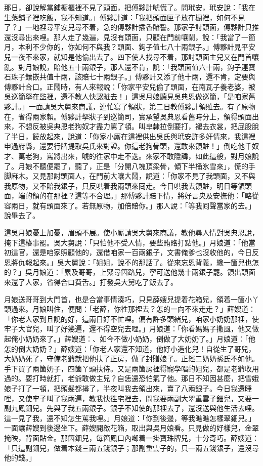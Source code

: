 那日，卻說解當鋪橱櫃裡不見了頭面，把傅夥計唬慌了。問玳安，玳安說：「我在生藥鋪子裡吃飯，我不知道。」傅夥計道：「我把頭面匣子放在橱裡，如何不見了？」一地裡尋平安兒尋不着，急的傅夥計插香賭誓。那家子討頭面，傅夥計只推還沒尋出來哩。那人走了幾遍，見沒有頭面，只顧在門前嚷鬧，說：「我當了一箇月，本利不少你的，你如何不與我？頭面、鉤子值七八十兩銀子。」傅夥計見平安兒一夜不來家，就知是他偷出去了。四下使人找尋不着，那討頭面主兒又在門首嚷亂。對月娘說，賠他五十兩銀子，那人還不肯，說：「我頭面值六十兩，鉤子連寶石珠子鑲嵌共值十兩，該賠七十兩銀子。」傅夥計又添了他十兩，還不肯，定要與傅夥計合口。正鬧時，有人來報說：「你家平安兒偷了頭面，在南瓦子養老婆，被吳巡簡拏在監裡，還不教人快認賍去！」這吳月娘聽見吳典恩做巡簡，「是咱家舊夥計。」一面請吳大舅來商議，連忙寫了領狀，第二日教傅夥計領賍去。有了原物在，省得兩家賴。傅夥計拏狀子到巡簡司，實承望吳典恩看舊時分上，領得頭面出來，不想反被吳典恩老狗奴才盡力罵了頓。叫皁隸拉倒要打，褪去衣裳，把屁股脫了半日，饒放起來，說道：「你家小厮在這裡供出吳氏與玳安許多奸情來，我這裡申過府縣，還要行牌提取吳氏來對證。你這老狗骨頭，還敢來領賍！」{}倒吃他千奴才、萬老狗，罵將出來，唬的徃家中走不迭。來家不敢隱諱，如此這般，對月娘說了。月娘不聽便罷了，聽了，正是「分開八塊頂梁骨，傾下半桶氷雪來」，慌的手脚麻木。又見那討頭面人，在門前大嚷大鬧，說道：「你家不見了我頭面，又不與我原物，又不賠我銀子，只反哄着我兩頭來囘走。今日哄我去領賍，明日等領頭面，端的領的在那裡？這等不合理。」那傅夥計賠下情，將好言央及安撫他：「略從容兩日，就有頭面來了。若無原物，加倍賠你。」那人說：「等我囘聲當家的去。」說畢去了。

這吳月娘憂上加憂，眉頭不展。使小厮請吳大舅來商議，教他尋人情對吳典恩說，掩下這樁事罷。吳大舅說：「只怕他不受人情，要些賄賂打點他。」月娘道：「他當初這官，還是咱家照顧他的，還借咱家一百兩銀子，文書俺爹也沒收他的，今日反恩將仇報起來。」吳大舅說：「姐姐，說不的那話了。從來忘恩背義，纔一箇兒也怎的？」{}吳月娘道：「累及哥哥，上緊尋箇路兒，寧可送他幾十兩銀子罷。領出頭面來還了人家，省得合口費舌。」打發吳大舅吃了飯去了。

月娘送哥哥到大門首，也是合當事情湊巧，只見薛嫂兒提着花箱兒，領着一箇小丫頭過來。月娘叫住，便問：「老薛，你徃那裡去？怎的一向不來走走？」薛嫂道：「你老人家到且說的好，這兩日好不忙哩。偏有許多頭緒兒，咱家小奶奶那裡，使牢子大官兒，叫了好幾遍，還不得空兒去哩。」月娘道：「你看媽媽子撒風，他又做起俺小奶奶來了。」薛嫂道：、如今不做小奶奶，倒做了大奶奶了。」月娘道：「他怎的倒大奶奶？」薛嫂道：「你老人家還不知道，他好小造化兒！自從生了哥兒，大奶奶死了，守備老爺就把他扶了正房，做了封贈娘子。正經二奶奶孫氏不如他。手下買了兩箇奶子，四箇丫頭扶侍。又是兩箇房裡得寵學唱的姐兒，都是老爺收用過的。要打時就打，老爺敢做主兒？自恁還恐怕氣了他。那日不知因甚麼，把雪娥娘子打了一頓，把頭髮都撏了，半夜叫我去領出來，賣了八兩銀子。今日我還睡哩，又使牢子叫了我兩遍，教我快徃宅裡去，問我要兩副大翠重雲子鈿兒，又要一副九鳳鈿兒。先與了我五兩銀子。銀子不知使的那裡去了，還沒送與他生活去哩。這一見了我，還不知怎生罵我哩。」月娘道：「你到後邊，等我瞧瞧怎樣翠鈿兒。」一面讓薛嫂到後邊坐下。薛嫂開啟花箱，取出與吳月娘看。只見做的好樣兒，金翠掩映，背面貼金。那箇鈿兒，每箇鳳口內啣着一掛寶珠牌兒，十分奇巧。薛嫂道：「只這副鈿兒，做着本錢三兩五錢銀子；那副重雲子的，只一兩五錢銀子，還沒尋他的錢。」


